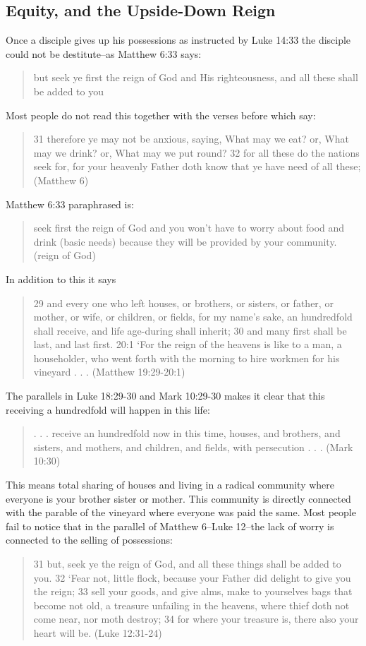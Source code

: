 \documentclass[11pt]{article}
\begin{document}
\subsection{Equity, and the Upside-Down Reign}
Once a disciple gives up his possessions as instructed by Luke 14:33 the disciple could not be destitute--as Matthew 6:33 says: 
\begin{quote}
but seek ye first the reign of God and His righteousness, and all these shall be added to you
\end{quote}
Most people do not read this together with the verses before which say:
\begin{quote}
31 therefore ye may not be anxious, saying, What may we eat? or, What may we drink? or, What may we put round? 32 for all these do the nations seek for, for your heavenly Father doth know that ye have need of all these; (Matthew 6) 
\end{quote}
Matthew 6:33 paraphrased is:
\begin{quote}
seek first the reign of God and you won't have to worry about food and drink (basic needs) because they will be provided by your community. (reign of God)
\end{quote}
In addition to this it says 
\begin{quote}
29 and every one who left houses, or brothers, or sisters, or father, or mother, or wife, or children, or fields, for my name's sake, an hundredfold shall receive, and life age-during shall inherit; 30 and many first shall be last, and last first. 20:1 `For the reign of the heavens is like to a man, a householder, who went forth with the morning to hire workmen for his vineyard . . . (Matthew 19:29-20:1)
\end{quote}
The parallels in Luke 18:29-30 and Mark 10:29-30 makes it clear that this receiving a hundredfold will happen in this life: 
\begin{quote}
. . . receive an hundredfold now in this time, houses, and brothers, and sisters, and mothers, and children, and fields, with persecution . . . (Mark 10:30) 
\end{quote}
This means total sharing of houses and living in a radical community where everyone is your brother sister or mother. This community is directly connected with the parable of the vineyard where everyone was paid the same. Most people fail to notice that in the parallel of Matthew 6--Luke 12--the lack of worry is connected to the selling of possessions:
\begin{quote}
31 but, seek ye the reign of God, and all these things shall be added to you.
32 `Fear not, little flock, because your Father did delight to give you the reign;
33 sell your goods, and give alms, make to yourselves bags that become not old, a treasure unfailing in the heavens, where thief doth not come near, nor moth destroy;
34 for where your treasure is, there also your heart will be. (Luke 12:31-24)
\end{quote}
\end{document}
